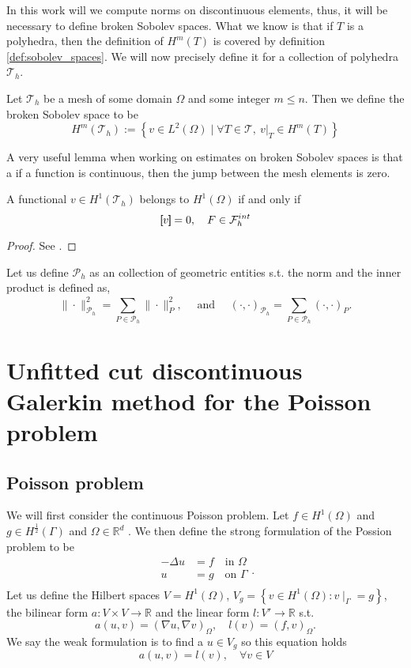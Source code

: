 In this work will we compute norms on discontinuous elements, thus, it will be necessary to define broken Sobolev spaces. What we know is that if $T$ is a polyhedra, then the definition of $H^{m}( T)$ is covered by definition
\ref{def:sobolev_spaces}. We will now precisely define it for a collection of polyhedra $\mathcal{T}_{h}$.

\begin{definition}
Let $\mathcal{T}_{h} $ be a mesh of some domain $\Omega  $ and some integer $m\le n$. Then we define the broken Sobolev space to be \[
H^{m}( \mathcal{T}_{h} ) := \left\{ v \in L^2( \Omega )  \mid  \forall T \in  \mathcal{T}, \ v|_{T} \in H^{m}( T)     \right\}
\]
\end{definition}
A very useful lemma when working on estimates on broken Sobolev spaces is that a if a function is continuous, then the jump between the mesh elements is zero.
\begin{lemma}
    A functional $ v \in  H^{1}( \mathcal{T}_{h} ) $ belongs to $ H^{1}( \Omega )  $ if and only if \[
    \left[\!\!\left[  v  \right]\!\!\right]   = 0, \quad F \in \mathcal{F}^{int}_{h}
    \]
\end{lemma}
\begin{proof}
    See \cite[Lemma 1.23]{pietro2012}.
\end{proof}

Let us define $\mathcal{P} _{h}$ as an collection of geometric entities s.t. the norm and the inner product is defined as,
\[
 \| \cdot \|_{\mathcal{P}_{h}}^{2} = \sum_{P \in \mathcal{P} _{h}}^{} \| \cdot  \|_{ P }^{2  }, \quad \text{ and } \quad
 (\cdot ,\cdot )_{\mathcal{P}
_{h}}^{} = \sum_{P \in \mathcal{P} _{h}}^{} (\cdot ,\cdot )_{ P }^{  } .
\]





\newpage
\section{Unfitted cut discontinuous Galerkin method for the Poisson problem}%
\label{sec:elliptic}

\subsection{Poisson problem}%
\label{sub:possion_problem}
We will first consider the continuous Poisson problem. Let $f \in H^1( \Omega ) $ and $g \in H^{\frac{1}{2}}( \Gamma ) $ and $\Omega  \in \mathbb{R} ^{d}$ . We then define the strong formulation of the Possion problem to be \[
\begin{split}
    -\Delta u &= f \quad  \text{in }\Omega  \\
     u &= g  \quad \text{on } \Gamma    \\
\end{split} .
\]
Let us define the Hilbert spaces $V=H^{1}( \Omega ) $,   $V_{g} = \left\{ v \in H^{1}( \Omega ): v \mid _{\Gamma } = g \right\} $, the bilinear form $a: V \times V  \to \mathbb{R}  $ and the linear form $l: V'\to \mathbb{R}  $ s.t. \[
a( u,v) = ( \nabla u, \nabla v) _{\Omega }, \quad l( v) = (f,v)_{\Omega }.
\]
We say the weak formulation is to find a $u \in V_{g}$ so this equation holds  \[
a( u,v) = l( v), \quad  \forall v \in V
\]
